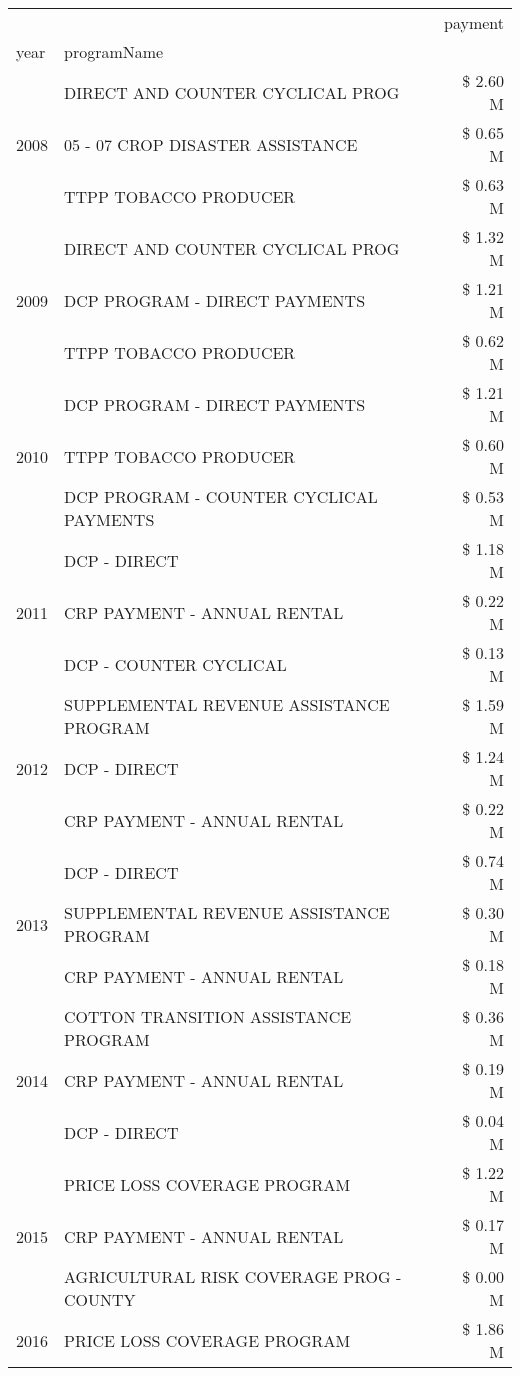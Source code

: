 \begin{tabular}{llr}
\toprule
 &  & payment \\
year & programName &  \\
\midrule
\multirow[t]{3}{*}{2008} & DIRECT AND COUNTER CYCLICAL PROG & \$ 2.60 M \\
 & 05 - 07 CROP DISASTER ASSISTANCE & \$ 0.65 M \\
 & TTPP TOBACCO PRODUCER & \$ 0.63 M \\
\cline{1-3}
\multirow[t]{3}{*}{2009} & DIRECT AND COUNTER CYCLICAL PROG & \$ 1.32 M \\
 & DCP PROGRAM - DIRECT PAYMENTS & \$ 1.21 M \\
 & TTPP TOBACCO PRODUCER & \$ 0.62 M \\
\cline{1-3}
\multirow[t]{3}{*}{2010} & DCP PROGRAM - DIRECT PAYMENTS & \$ 1.21 M \\
 & TTPP TOBACCO PRODUCER & \$ 0.60 M \\
 & DCP PROGRAM - COUNTER CYCLICAL PAYMENTS & \$ 0.53 M \\
\cline{1-3}
\multirow[t]{3}{*}{2011} & DCP - DIRECT & \$ 1.18 M \\
 & CRP PAYMENT - ANNUAL RENTAL & \$ 0.22 M \\
 & DCP - COUNTER CYCLICAL & \$ 0.13 M \\
\cline{1-3}
\multirow[t]{3}{*}{2012} & SUPPLEMENTAL REVENUE ASSISTANCE PROGRAM & \$ 1.59 M \\
 & DCP - DIRECT & \$ 1.24 M \\
 & CRP PAYMENT - ANNUAL RENTAL & \$ 0.22 M \\
\cline{1-3}
\multirow[t]{3}{*}{2013} & DCP - DIRECT & \$ 0.74 M \\
 & SUPPLEMENTAL REVENUE ASSISTANCE PROGRAM & \$ 0.30 M \\
 & CRP PAYMENT - ANNUAL RENTAL & \$ 0.18 M \\
\cline{1-3}
\multirow[t]{3}{*}{2014} & COTTON TRANSITION ASSISTANCE PROGRAM & \$ 0.36 M \\
 & CRP PAYMENT - ANNUAL RENTAL & \$ 0.19 M \\
 & DCP - DIRECT & \$ 0.04 M \\
\cline{1-3}
\multirow[t]{3}{*}{2015} & PRICE LOSS COVERAGE PROGRAM & \$ 1.22 M \\
 & CRP PAYMENT - ANNUAL RENTAL & \$ 0.17 M \\
 & AGRICULTURAL RISK COVERAGE PROG - COUNTY & \$ 0.00 M \\
\cline{1-3}
\multirow[t]{3}{*}{2016} & PRICE LOSS COVERAGE PROGRAM & \$ 1.86 M \\

\end{tabular}
